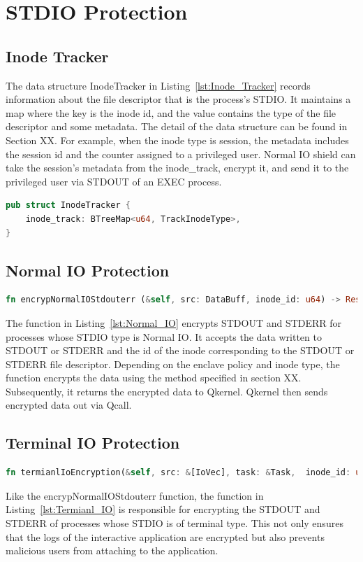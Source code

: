 \section{STDIO Protection}

\subsection{Inode Tracker}
The data structure InodeTracker in Listing~\ref{lst:Inode_Tracker} records information about the file descriptor that is the process’s STDIO. It maintains a map where the key is the inode id, and the value contains the type of the file descriptor and some metadata. 
The detail of the data structure can be found in Section XX. For example, when the inode type is session, the metadata includes the session id and the counter assigned to a privileged user. Normal IO shield can take the session's metadata from the inode\_track, encrypt it, and send it to
the privileged user via STDOUT of an EXEC process.
\begin{lstlisting}[language=rust, caption= API of Inode Tracker, label={lst:Inode_Tracker}]
pub struct InodeTracker {
    inode_track: BTreeMap<u64, TrackInodeType>,
} 
\end{lstlisting}

\subsection{Normal IO Protection}
\begin{lstlisting}[language=rust, caption= API of normal IO shield, label={lst:Normal_IO}]
fn encrypNormalIOStdouterr (&self, src: DataBuff, inode_id: u64) -> Result<DataBuff>
\end{lstlisting}
The function in Listing~\ref{lst:Normal_IO} encrypts STDOUT and STDERR for processes whose STDIO type is Normal IO. It accepts the data written to STDOUT or STDERR and the id of the inode corresponding to the STDOUT or STDERR file descriptor. Depending on the enclave policy and inode type, the 
function encrypts the data using the method specified in section XX. Subsequently, it returns the encrypted data to Qkernel. Qkernel then sends encrypted data out via Qcall.


\subsection{Terminal IO Protection}
\begin{lstlisting}[language=rust, caption= API of system call interceptor, label={lst:Termianl_IO}]
fn termianlIoEncryption(&self, src: &[IoVec], task: &Task,  inode_id: u64) -> Result<(Vec::<IoVec>)
\end{lstlisting}
Like the encrypNormalIOStdouterr function, the function in Listing~\ref{lst:Termianl_IO} is responsible for encrypting the STDOUT and STDERR of processes whose STDIO is of terminal type. This not only ensures that the logs of the interactive application are encrypted but also prevents malicious 
users from attaching to the application.

